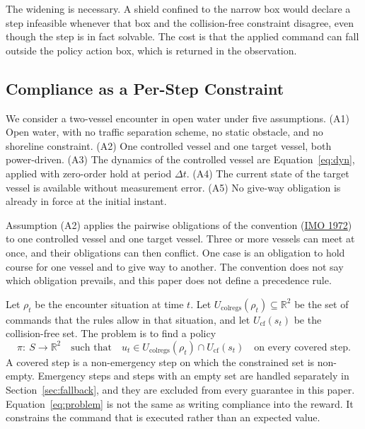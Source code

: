 \documentclass[10pt,letterpaper]{article}
\newcommand{\citl}[2]{(\hyperlink{ref:#1}{#2})}
\begin{document}
The widening is necessary. A shield confined to the narrow box would declare a step
infeasible whenever that box and the collision-free constraint disagree, even though the
step is in fact solvable. The cost is that the applied command can fall outside the policy action box, which is
returned in the observation.

\subsection{Compliance as a Per-Step Constraint}
\label{sec:problem}

We consider a two-vessel encounter in open water under five assumptions. (A1) Open water,
with no traffic separation scheme, no static obstacle, and no shoreline constraint. (A2)
One controlled vessel and one target vessel, both power-driven. (A3) The dynamics of the
controlled vessel are Equation~\eqref{eq:dyn}, applied with zero-order hold at period
$\Delta t$. (A4) The current state of the target vessel is available without measurement
error. (A5) No give-way obligation is already in force at the initial instant.

Assumption (A2) applies the pairwise obligations of the convention \citl{imo1972}{IMO
1972} to one controlled vessel and one target vessel. Three or more vessels can meet at
once, and their obligations can then conflict. One case is an obligation to hold course
for one vessel and to give way to another. The convention does not say which obligation
prevails, and this paper does not define a precedence rule.

Let $\rho_t$ be the encounter situation at time $t$. Let
$U_{\mathrm{colregs}}(\rho_t)\subseteq\mathbb{R}^2$ be the set of commands that the rules
allow in that situation, and let $U_{\mathrm{cf}}(s_t)$ be the collision-free set. The
problem is to find a policy
\begin{equation}
 \pi:\ S\rightarrow\mathbb{R}^2
 \quad\text{such that}\quad
 u_t\in U_{\mathrm{colregs}}(\rho_t)\cap U_{\mathrm{cf}}(s_t)
 \quad \text{on every covered step}.
 \label{eq:problem}
\end{equation}
A covered step is a non-emergency step on which the constrained set is non-empty.
Emergency steps and steps with an empty set are handled separately in
Section~\ref{sec:fallback}, and they are excluded from every guarantee in this paper.
Equation~\eqref{eq:problem} is not the same as writing compliance into the reward. It
constrains the command that is executed rather than an expected value.
\end{document}
